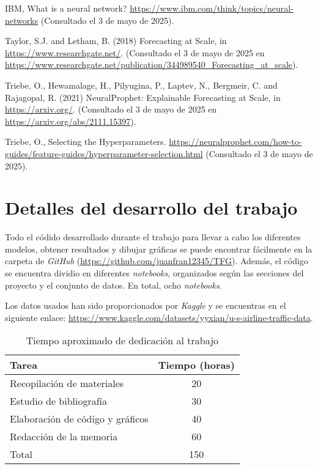 \documentclass[12pt,twoside]{article}
\begin{document}
\begin{thebibliography}{100}
IBM, What is a neural network? \url{https://www.ibm.com/think/topics/neural-networks} (Consultado el 3 de mayo de 2025).

Taylor, S.J. and Letham, B. (2018) Forecasting at Scale, in \url{https://www.researchgate.net/}. (Consultado el 3 de mayo de 2025 en \url{https://www.researchgate.net/publication/344989540_Forecasting_at_scale}).

Triebe, O., Hewamalage, H., Pilyugina, P., Laptev, N., Bergmeir, C. and Rajagopal, R. (2021) NeuralProphet: Explainable Forecasting at Scale, in \url{https://arxiv.org/}. (Consultado el 3 de mayo de 2025 en \url{https://arxiv.org/abs/2111.15397}).

Triebe, O., Selecting the Hyperparameters. \url{https://neuralprophet.com/how-to-guides/feature-guides/hyperparameter-selection.html} (Consultado el 3 de mayo de 2025).

\end{thebibliography}

\newpage
\appendix

\section{Detalles del desarrollo del trabajo}
Todo el códido desarrollado durante el trabajo para llevar a cabo los diferentes modelos, obtener resultados y dibujar gráficas se puede encontrar fácilmente en la carpeta de \textit{GitHub} (\url{https://github.com/juanfran12345/TFG}). Además, el código se encuentra dividio en diferentes \textit{notebooks}, organizados según las secciones del proyecto y el conjunto de datos. En total, ocho \textit{notebooks}.

Los datos usados han sido proporcionados por \textit{Kaggle} y se encuentras en el siguiente enlace: \href{https://www.kaggle.com/datasets/yyxian/u-s-airline-traffic-data}{https://www.kaggle.com/datasets/yyxian/u-s-airline-traffic-data}.

\begin{table}[ht] 
\centering
\begin{tabular}{lc} 
  \hline
 Tarea & Tiempo (horas) \\ 
  \hline
Recopilación de materiales &   20 \\ 
Estudio de bibliografía &   30 \\ 
Elaboración de código y gráficos &  40 \\ 
Redacción de la memoria &  60 \\
 \hline
Total & 150\\
\hline
\end{tabular}
\caption{Tiempo aproximado de dedicación al trabajo} \label{tab{02}}
\end{table}
\end{document}
